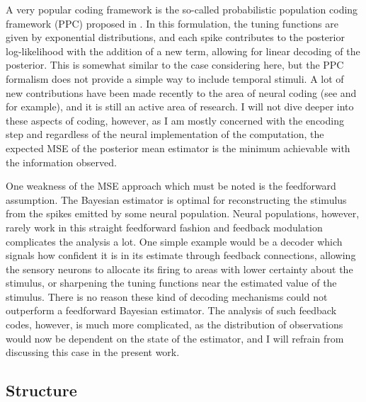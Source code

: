 A very popular coding framework is the so-called probabilistic population coding framework (PPC) proposed in . In this formulation, the tuning functions
are given by exponential distributions, and each spike contributes to the posterior log-likelihood with the addition of a new term, allowing for linear decoding of the posterior. This is
somewhat similar to the case considering here, but the PPC formalism does not provide a simple way to include temporal stimuli. A lot of new contributions have been made recently
to the area of neural coding
(see  and  for example), and it is still an active area of research. I will not dive deeper into these aspects of coding,
however, as I am mostly concerned with the encoding step and regardless of the neural implementation
of the computation, the expected MSE of the posterior mean estimator is the minimum achievable with the information observed.\par

One weakness of the MSE approach which must be noted is the feedforward assumption. The Bayesian estimator is optimal for reconstructing the stimulus from the
spikes emitted by some neural population. Neural populations, however, rarely work in this straight feedforward fashion and feedback modulation complicates the 
analysis a lot. One simple example would be a decoder which signals how confident it is in its estimate through feedback connections, allowing the sensory neurons to
allocate its firing to areas with lower certainty about the stimulus, or sharpening the tuning functions near the estimated value of the stimulus. There is no reason
these kind of decoding mechanisms could not outperform a feedforward Bayesian estimator. The analysis of such feedback codes, however, is much more complicated,
as the distribution of observations would now be dependent on the state of the estimator, and I will refrain from discussing this case in the present work.


\subsection{Structure}

